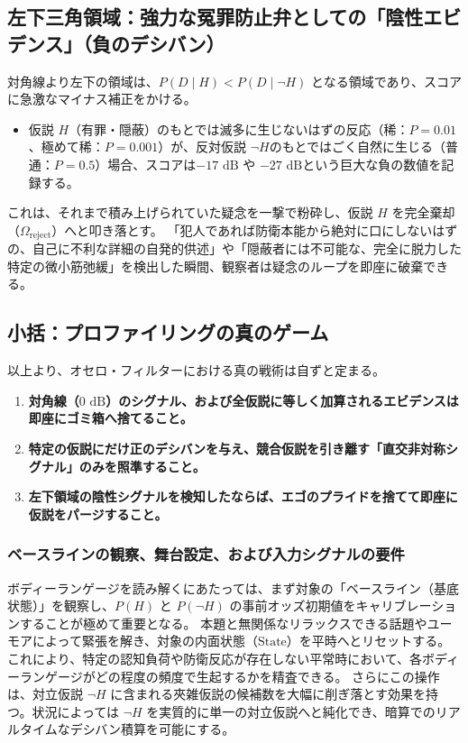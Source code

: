 \subsection{左下三角領域：強力な冤罪防止弁としての「陰性エビデンス」（負のデシバン）}
対角線より左下の領域は、$P(D \mid H) < P(D \mid \neg H)$ となる領域であり、スコアに急激なマイナス補正をかける。

\begin{itemize}
\item 仮説 $H$（有罪・隠蔽）のもとでは滅多に生じないはずの反応（稀：$P = 0.01$、極めて稀：$P = 0.001$）が、反対仮説 $\neg H$のもとではごく自然に生じる（普通：$P = 0.5$）場合、スコアは$-17\text{ dB}$ や $-27\text{ dB}$という巨大な負の数値を記録する。
\end{itemize}
これは、それまで積み上げられていた疑念を一撃で粉砕し、仮説 $H$ を完全棄却（$\Omega_{\mathrm{reject}}$）へと叩き落とす。
「犯人であれば防衛本能から絶対に口にしないはずの、自己に不利な詳細の自発的供述」や「隠蔽者には不可能な、完全に脱力した特定の微小筋弛緩」を検出した瞬間、観察者は疑念のループを即座に破棄できる。

\subsection{小括：プロファイリングの真のゲーム}
以上より、オセロ・フィルターにおける真の戦術は自ずと定まる。
\begin{enumerate}[label=(\arabic*)]
\item \textbf{対角線（$0\text{ dB}$）のシグナル、および全仮説に等しく加算されるエビデンスは即座にゴミ箱へ捨てること。}
\item \textbf{特定の仮説にだけ正のデシバンを与え、競合仮説を引き離す「直交非対称シグナル」のみを照準すること。}
\item \textbf{左下領域の陰性シグナルを検知したならば、エゴのプライドを捨てて即座に仮説をパージすること。}
\end{enumerate}

\subsubsection*{ベースラインの観察、舞台設定、および入力シグナルの要件}
ボディーランゲージを読み解くにあたっては、まず対象の「ベースライン（基底状態）」を観察し、$P(H)$ と $P(\neg H)$ の事前オッズ初期値をキャリブレーションすることが極めて重要となる。
本題と無関係なリラックスできる話題やユーモアによって緊張を解き、対象の内面状態（$\mathrm{State}$）を平時へとリセットする。これにより、特定の認知負荷や防衛反応が存在しない平常時において、各ボディーランゲージがどの程度の頻度で生起するかを精査できる。
さらにこの操作は、対立仮説 $\neg H$ に含まれる夾雑仮説の候補数を大幅に削ぎ落とす効果を持つ。状況によっては $\neg H$ を実質的に単一の対立仮説へと純化でき、暗算でのリアルタイムなデシバン積算を可能にする。


